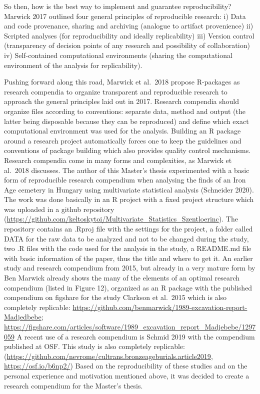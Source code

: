 \documentclass[
]{article}
\begin{document}
So then, how is the best way to implement and guarantee reproducibility? Marwick 2017 outlined four general principles of reproducible research:
i) Data and code provenance, sharing and archiving (analogue to artifact provenience)
ii) Scripted analyses (for reproducibility and ideally replicability)
iii) Version control (transparency of decision points of any research and possibility of collaboration)
iv) Self-contained computational environments (sharing the computational environment of the analysis for replicability).

Pushing forward along this road, Marwick et al.~2018 propose R-packages as research compendia to organize transparent and reproducible research to approach the general principles laid out in 2017. Research compendia should organize files according to conventions: separate data, method and output (the latter being disposable because they can be reproduced) and define which exact computational environment was used for the analysis. Building an R package around a research project automatically forces one to keep the guidelines and conventions of package building which also provides quality control mechanisms.
Research compendia come in many forms and complexities, as Marwick et al.~2018 discusses. The author of this Master's thesis experimented with a basic form of reproducible research compendium when analysing the finds of an Iron Age cemetery in Hungary using multivariate statistical analysis (Schneider 2020). The work was done basically in an R project with a fixed project structure which was uploaded in a github repository (\url{https://github.com/keltoskytoi/Multivariate_Statistics_Szentloerinc}). The repository contains an .Rproj file with the settings for the project, a folder called DATA for the raw data to be analyzed and not to be changed during the study, two .R files with the code used for the analysis in the study, a README.md file with basic information of the paper, thus the title and where to get it. An earlier study and research compendium from 2015, but already in a very mature form by Ben Marwick already shows the many of the elements of an optimal research compendium (listed in Figure 12), organized as an R package with the published compendium on figshare for the study Clarkson et al.~2015 which is also completely replicable: \url{https://github.com/benmarwick/1989-excavation-report-Madjedbebe}; \url{https://figshare.com/articles/software/1989_excavation_report_Madjebebe/1297059}
A recent use of a research compendium is Schmid 2019 with the compendium published at OSF. This study is also completely replicable:
(\url{https://github.com/nevrome/cultrans.bronzeageburials.article2019}, \url{https://osf.io/b6np2/})
Based on the reproducibility of these studies and on the personal experience and motivation mentioned above, it was decided to create a research compendium for the Master's thesis.
\end{document}
